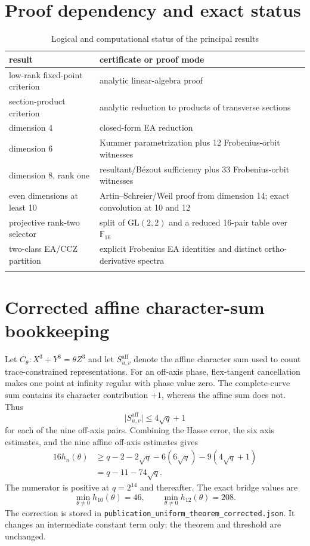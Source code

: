 \documentclass[pdflatex,sn-mathphys-num]{sn-jnl}
\newcommand{\F}{\mathbb F}
\newcommand{\abs}[1]{\lvert#1\rvert}
\begin{document}
\section{Proof dependency and exact status}

\begin{table}[ht]
\caption{Logical and computational status of the principal results}
\begin{tabular*}{\textwidth}{@{\extracolsep\fill}p{}p{}}
\toprule
result & certificate or proof mode\\
\midrule
low-rank fixed-point criterion & analytic linear-algebra proof\\
section-product criterion & analytic reduction to products of transverse sections\\
dimension 4 & closed-form EA reduction\\
dimension 6 & Kummer parametrization plus 12 Frobenius-orbit witnesses\\
dimension 8, rank one & resultant/B\'ezout sufficiency plus 33 Frobenius-orbit witnesses\\
even dimensions at least 10 & Artin--Schreier/Weil proof from dimension 14; exact convolution at 10 and 12\\
projective rank-two selector & split of $\mathrm{GL}(2,2)$ and a reduced 16-pair table over $\F_{16}$\\
two-class EA/CCZ partition & explicit Frobenius EA identities and distinct ortho-derivative spectra\\
\botrule
\end{tabular*}
\end{table}

\section{Corrected affine character-sum bookkeeping}

Let $C_\theta:X^3+Y^3=\theta Z^3$ and let $S_{u,v}^{\mathrm{aff}}$ denote the affine character sum used to count trace-constrained representations.  For an off-axis phase, flex-tangent cancellation makes one point at infinity regular with phase value zero.  The complete-curve sum contains its character contribution $+1$, whereas the affine sum does not.  Thus
\[
 \abs{S_{u,v}^{\mathrm{aff}}}\le 4\sqrt q+1
\]
for each of the nine off-axis pairs.  Combining the Hasse error, the six axis estimates, and the nine affine off-axis estimates gives
\begin{align*}
 16h_n(\theta)
 &\ge q-2-2\sqrt q-6(6\sqrt q)-9(4\sqrt q+1)\\
 &=q-11-74\sqrt q.
\end{align*}
The numerator is positive at $q=2^{14}$ and thereafter.  The exact bridge values are
\[
 \min_{\theta\ne0}h_{10}(\theta)=46,
 \qquad
 \min_{\theta\ne0}h_{12}(\theta)=208.
\]
The correction is stored in \nolinkurl{publication_uniform_theorem_corrected.json}.  It changes an intermediate constant term only; the theorem and threshold are unchanged.
\end{document}
